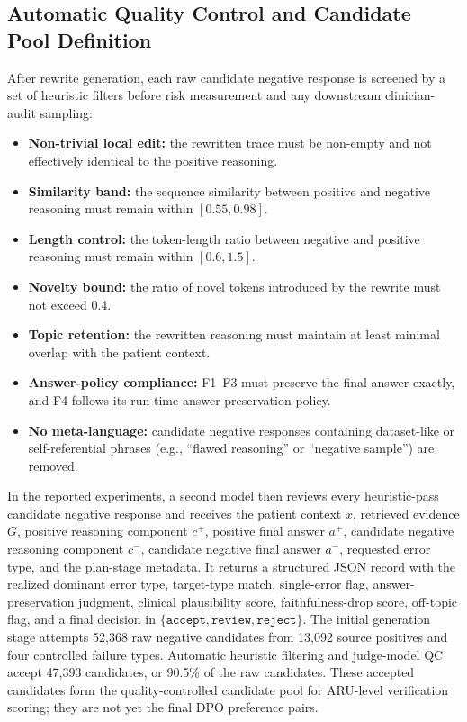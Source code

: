 \documentclass[a4paper,fleqn,doubleblind]{cas-sc}
\begin{document}
\subsection{Automatic Quality Control and Candidate Pool Definition}

After rewrite generation, each raw candidate negative response is screened by a set of heuristic filters before risk measurement and any downstream clinician-audit sampling:
\begin{itemize}[leftmargin=*]
    \item \textbf{Non-trivial local edit:} the rewritten trace must be non-empty and not effectively identical to the positive reasoning.
    \item \textbf{Similarity band:} the sequence similarity between positive and negative reasoning must remain within $[0.55, 0.98]$.
    \item \textbf{Length control:} the token-length ratio between negative and positive reasoning must remain within $[0.6, 1.5]$.
    \item \textbf{Novelty bound:} the ratio of novel tokens introduced by the rewrite must not exceed 0.4.
    \item \textbf{Topic retention:} the rewritten reasoning must maintain at least minimal overlap with the patient context.
    \item \textbf{Answer-policy compliance:} F1--F3 must preserve the final answer exactly, and F4 follows its run-time answer-preservation policy.
    \item \textbf{No meta-language:} candidate negative responses containing dataset-like or self-referential phrases (e.g., ``flawed reasoning'' or ``negative sample'') are removed.
\end{itemize}

In the reported experiments, a second model then reviews every heuristic-pass candidate negative response and receives the patient context $x$, retrieved evidence $G$, positive reasoning component $c^{+}$, positive final answer $a^{+}$, candidate negative reasoning component $c^{-}$, candidate negative final answer $a^{-}$, requested error type, and the plan-stage metadata. It returns a structured JSON record with the realized dominant error type, target-type match, single-error flag, answer-preservation judgment, clinical plausibility score, faithfulness-drop score, off-topic flag, and a final decision in $\{\texttt{accept},\texttt{review},\texttt{reject}\}$.
The initial generation stage attempts 52,368 raw negative candidates from 13,092 source positives and four controlled failure types. Automatic heuristic filtering and judge-model QC accept 47,393 candidates, or 90.5\% of the raw candidates. These accepted candidates form the quality-controlled candidate pool for ARU-level verification scoring; they are not yet the final DPO preference pairs.
\end{document}
